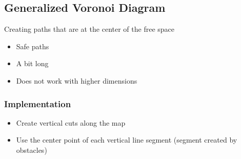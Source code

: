\subsection{Generalized Voronoi Diagram}

  Creating paths that are at the center of the free space

  \begin{itemize}
    \item Safe paths
    \item A bit long
    \item Does not work with higher dimensions
  \end{itemize}

  \subsubsection{Implementation}

    \begin{itemize}
      \item Create vertical cuts along the map
      \item Use the center point of each vertical line segment
      (segment created by obstacles)
    \end{itemize}
